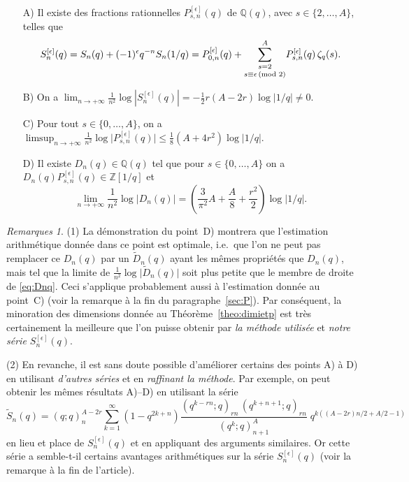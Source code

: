 \documentclass[12pt]{amsart}
\newcommand{\io}{\infty}
\newcommand{\ep}{\epsilon}
\newcommand{\dis}{\displaystyle}
\theoremstyle{remark}
\newtheorem*{remarks}{Remarques}
\numberwithin{equation}{section}
\begin{document}
\medskip
\begin{itemize}
\item[A)] Il existe des fractions rationnelles $P_{s,n}^{[\ep]}(q)$ de $\mathbb{Q}(q)$, 
avec $s\in\{2,\ldots, A\}$,  
telles que 
$$
S_n^{[\ep]}(q)=S_n(q)+(-1)^{\ep}q^{-n}S_n(1/q)=
P_{0,n}^{[\ep]}(q)+
\underset{s\equiv \ep \,(\textup {mod }2)}{\sum_{{s=2}}^{A}} 
P_{s,n}^{[\ep]}(q)\,\zeta_q(s).
$$

\item[B)] On a 
$\dis 
\lim_{n\to +\io}\frac{1}{n^2}\log\left\vert S_{n}^{[\ep]}(q)\right\vert =- \frac 12
r(A-2r) \log\vert 1/q\vert \ne 0$.

\item[C)] Pour tout $s\in\{0,\ldots, A\}$,  on a 
$\dis 
\limsup_{n\to +\io}\frac{1}{n^2}\log\vert P_{s,n}^{[\ep]}(q)\vert \le
\frac {1} {8}\left( A+4r^2\right) \log \vert 1/q\vert
$.

\item[D)] Il existe $D_n(q)\in\mathbb{Q}(q)$ tel que pour $s\in\{0,\ldots, A\}$ on a 
$D_n(q)P_{s,n}^{[\ep]}(q)\in\mathbb{Z}[1/q]$ et 
\begin{equation} \label{eq:Dnq}
\lim_{n\to +\io} \frac{1}{n^2}\log \vert D_n(q) \vert
= \left(\frac{3}{\pi^2}A+\frac A8 + \frac {r^2} 2\right)\log \vert 1/q\vert.
\end{equation}
\end{itemize}

\begin{remarks} (1) La d{\'e}monstration du point~D)
montrera que l'estimation arithm{\'e}tique 
donn{\'e}e dans ce point est optimale, i.e.\ que l'on
ne peut pas remplacer ce $D_n(q)$ par un  $\tilde
D_n(q)$ ayant les m{\^e}mes propri{\'e}t{\'e}s que 
$D_n(q)$, mais tel que la limite de  
$\frac{1}{n^2}\log \vert \tilde D_n(q) \vert$ soit
plus petite que le membre de droite de \eqref{eq:Dnq}. 
Ceci s'applique 
probablement aussi {\`a} l'estimation donn{\'e}e au point~C) (voir la 
remarque {\`a} la fin du paragraphe~\ref{sec:P}). 
Par cons{\'e}quent, la minoration des dimensions donn{\'e}e au
Th{\'e}or{\`e}me~\ref{theo:dimietp} est tr{\`e}s certainement la meilleure 
que l'on puisse obtenir par {\it la m{\'e}thode 
utilis{\'e}e} et {\it notre s{\'e}rie $S_{n}^{[\ep]}(q)$}. 

\medskip

(2) En revanche, il est sans doute possible d'am{\'e}liorer 
certains des points A) {\`a} D) en
utilisant {\it d'autres s{\'e}ries} et en {\it raffinant la m{\'e}thode}. 
Par exemple, on peut obtenir les m{\^e}mes r{\'e}sultats A)--D) en
utilisant la s{\'e}rie
\begin{equation} \label{eq:Salt}
\tilde S_n(q)
= (q;q)_n^{A-2r}
\sum_{k=1}^{\io} \left(1-q^{2k+n}\right)
\frac{(q^{k-rn};q)_{rn}\,(q^{k+n+1};q)_{rn}}
{(q^k;q)_{n+1}^{A}}\;q^{k((A-2r)n/2+A/2-1)}
\end{equation}
en lieu et place de $S_{n}^{[\ep]}(q)$ et  en appliquant des arguments 
similaires. Or cette s{\'e}rie a semble-t-il certains avantages arithm{\'e}tiques
sur la s{\'e}rie $S_{n}^{[\ep]}(q)$ (voir la remarque {\`a} la 
fin de l'article).
\end{remarks}
\end{document}
